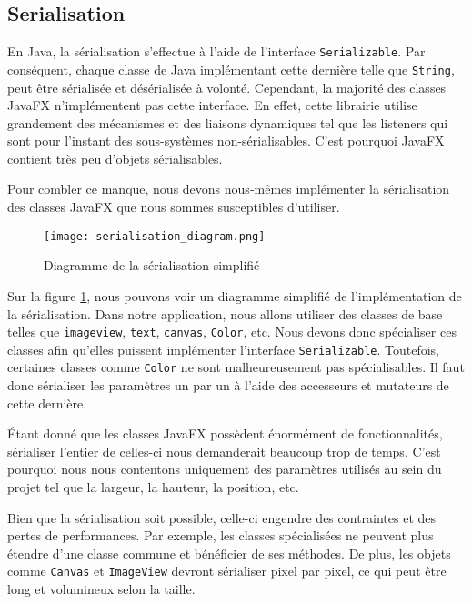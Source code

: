 \subsection{Serialisation}
\label{sec:serialisation}

En Java, la sérialisation s'effectue à l'aide de l'interface \texttt{Serializable}. Par conséquent, chaque classe de Java implémentant cette dernière telle que \texttt{String}, peut être sérialisée et désérialisée à volonté. Cependant, la majorité des classes JavaFX n'implémentent pas cette interface. En effet, cette librairie utilise grandement des mécanismes et des liaisons dynamiques tel que les listeners qui sont pour l'instant des sous-systèmes non-sérialisables. C'est pourquoi JavaFX contient très peu d'objets sérialisables.

Pour combler ce manque, nous devons nous-mêmes implémenter la sérialisation des classes JavaFX que nous sommes susceptibles d'utiliser.

\begin{figure}[!ht]
    \caption{Diagramme de la sérialisation simplifié}
    \centering
    \texttt{[image: serialisation\_diagram.png]}
    \label{fig:seri_diag}
\end{figure}

Sur la figure \ref{fig:seri_diag}, nous pouvons voir un diagramme simplifié de l'implémentation de la sérialisation. Dans notre application, nous allons utiliser des classes de base telles que \texttt{\gls{imageview}}, \texttt{\gls{text}}, \texttt{\gls{canvas}}, \texttt{Color}, etc. Nous devons donc spécialiser ces classes afin qu'elles puissent implémenter l'interface \texttt{Serializable}. Toutefois, certaines classes comme \texttt{Color} ne sont malheureusement pas spécialisables. Il faut donc sérialiser les paramètres un par un à l'aide des accesseurs et mutateurs de cette dernière.

Étant donné que les classes JavaFX possèdent énormément de fonctionnalités, sérialiser l'entier de celles-ci nous demanderait beaucoup trop de temps. C'est pourquoi nous nous contentons uniquement des paramètres utilisés au sein du projet tel que la largeur, la hauteur, la position, etc.



Bien que la sérialisation soit possible, celle-ci engendre des contraintes et des pertes de performances. Par exemple, les classes spécialisées ne peuvent plus étendre d'une classe commune et bénéficier de ses méthodes. De plus, les objets comme \texttt{Canvas} et \texttt{ImageView} devront sérialiser pixel par pixel, ce qui peut être long et volumineux selon la taille.

